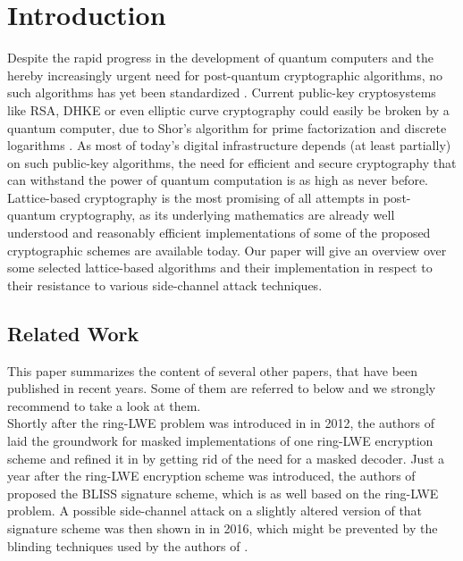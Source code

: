%
%

\chapter{Introduction}
Despite the rapid progress in the development of quantum computers and the hereby increasingly urgent need for post-quantum cryptographic algorithms, no such algorithms has yet been standardized \cite{Nist}. Current public-key cryptosystems like RSA, DHKE or even elliptic curve cryptography could easily be broken by a quantum computer, due to Shor's algorithm for prime factorization and discrete logarithms \cite{Shor}. As most of today's digital infrastructure depends (at least partially) on such public-key algorithms, the need for efficient and secure cryptography that can withstand the power of quantum computation is as high as never before.\\
Lattice-based cryptography is the most promising of all attempts in post-quantum cryptography, as its underlying mathematics are already well understood and reasonably efficient implementations of some of the proposed cryptographic schemes are available today. Our paper will give an overview over some selected lattice-based algorithms and their implementation in respect to their resistance to various side-channel attack techniques.\\

\section{Related Work}
This paper summarizes the content of several other papers, that have been published in recent years. Some of them are referred to below and we strongly recommend to take a look at them.\\
Shortly after the \acs{ring-LWE} problem was introduced in \cite{cryptoeprint:2012:230} in 2012, the authors of \cite{maskedRing} laid the groundwork for masked implementations of one \acs{ring-LWE} encryption scheme and refined it in \cite{Reparaz2016} by getting rid of the need for a masked decoder. Just a year after the \acs{ring-LWE} encryption scheme was introduced, the authors of \cite{bliss} proposed the BLISS signature scheme, which is as well based on the \acs{ring-LWE} problem. A possible side-channel attack on a slightly altered version of that signature scheme was then shown in \cite{cryptoeprint:2016:300} in 2016, which might be prevented by the blinding techniques used by the authors of \cite{cryptoeprint:2016:276}.

